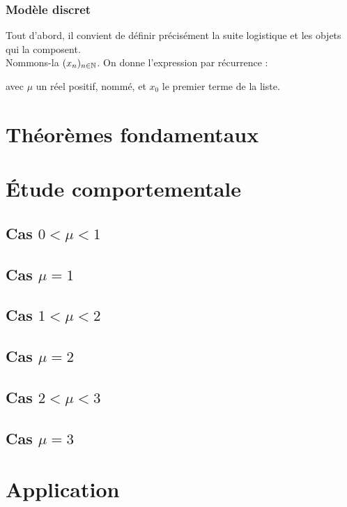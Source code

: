 \subsubsection{Modèle discret}
Tout d'abord, il convient de définir précisément la suite logistique et les
objets qui la composent.\\
Nommons-la $(x_n)_{n\in \mathbb{N}}$. On donne l'expression par récurrence :
avec $\mu $ un réel positif, nommé, et $ x_{0} $ le premier terme de la liste.
\section{Théorèmes fondamentaux}
\section{Étude comportementale}
\subsection{Cas $0 < \mu < 1$}
\subsection{Cas $\mu = 1$}
\subsection{Cas $1 < \mu < 2$}
\subsection{Cas $\mu = 2$}
\subsection{Cas $2 < \mu < 3$}
\subsection{Cas $\mu = 3$}
\section{Application}

